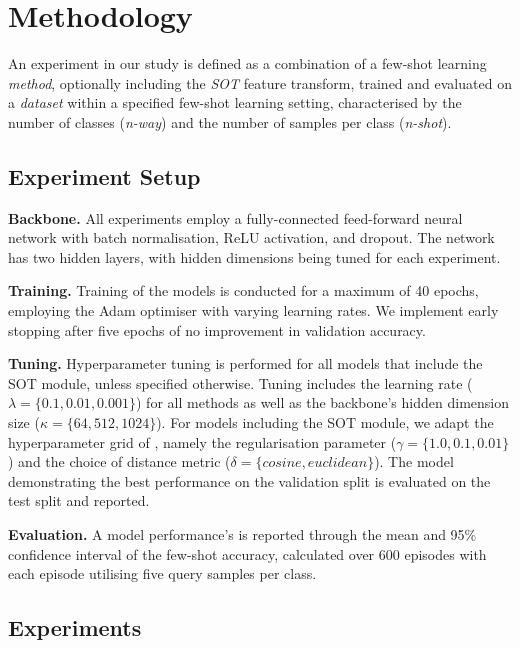 \section{Methodology}

An experiment in our study is defined as a combination of a few-shot learning \textit{method}, optionally including the \textit{SOT} feature transform, trained and evaluated on a \textit{dataset} within 
a specified few-shot learning setting, characterised by the number of classes (\textit{n-way}) and the number of samples per class (\textit{n-shot}).

\subsection{Experiment Setup}

\textbf{Backbone.} All experiments employ a fully-connected feed-forward neural network with batch normalisation, ReLU activation, and dropout. 
The network has two hidden layers, with hidden dimensions being tuned for each experiment.

\textbf{Training.} Training of the models is conducted for a maximum of 40 epochs, employing the Adam optimiser with varying learning rates. 
We implement early stopping after five epochs of no improvement in validation accuracy. 

\textbf{Tuning.} Hyperparameter tuning is performed for all models that include the SOT module, unless specified otherwise. Tuning includes the learning rate ($\lambda = \{0.1, 0.01, 0.001\}$) for all methods as well as the backbone's hidden dimension size ($\kappa = \{64, 512, 1024\}$). For models including the SOT module, we adapt the hyperparameter grid of \citeauthor{sot}, namely the regularisation parameter ($\gamma = \{1.0, 0.1, 0.01\}$) and the choice of distance metric ($\delta = \{cosine, euclidean\}$). 
The model demonstrating the best performance on the validation split is evaluated on the test split and reported.

\textbf{Evaluation.} A model performance's is reported through the mean and 95\% confidence interval of the few-shot accuracy, calculated over 600 episodes with each episode utilising five query samples per class.

\subsection{Experiments}

